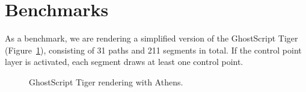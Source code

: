 \documentclass{sig-alternate}
\begin{document}
\section{Benchmarks}
\label{sec:bench}
As a benchmark, we are rendering a simplified version of the GhostScript Tiger (Figure~\ref{fig:gs_tiger}), consisting of 31 paths and 211 segments in total. If the control point layer is activated, each segment draws at least one control point.

\begin{figure}[t]
        \centering
        \hfill
    \caption{GhostScript Tiger rendering with Athens.}
    \label{fig:gs_tiger}
\end{figure}
\end{document}
